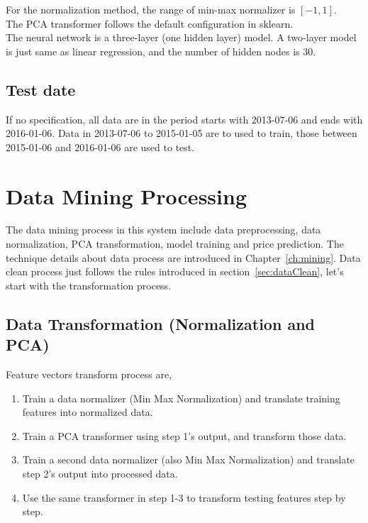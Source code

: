 For the normalization method, the range of min-max normalizer is $ [-1, 1] $.\\

The PCA transformer follows the default configuration in sklearn.\\

The neural network is a three-layer (one hidden layer) model. A two-layer model is just same as linear regression, and the number of hidden nodes is 30.

\subsection{Test date}
If no specification, all data are in the period starts with 2013-07-06 and ends with 2016-01-06. Data in 2013-07-06 to 2015-01-05 are to used to train, those between 2015-01-06 and 2016-01-06 are used to test.\\

\section{Data Mining Processing}
The data mining process in this system include data preprocessing, data normalization, PCA transformation, model training and price prediction. The technique details about data process are introduced in Chapter~\ref{ch:mining}. Data clean process just follows the rules introduced in section~\ref{sec:dataClean}, let's start with the transformation process.\\

\subsection{Data Transformation (Normalization and PCA)}

Feature vectors transform process are,
\begin{enumerate}
	\item Train a data normalizer (Min Max Normalization) and translate training features into normalized data.
	\item Train a PCA transformer using step 1's output, and transform those data.
	\item Train a second data normalizer (also Min Max Normalization) and translate step 2's output into processed data.
	\item Use the same transformer in step 1-3 to transform testing features step by step.
\end{enumerate}

